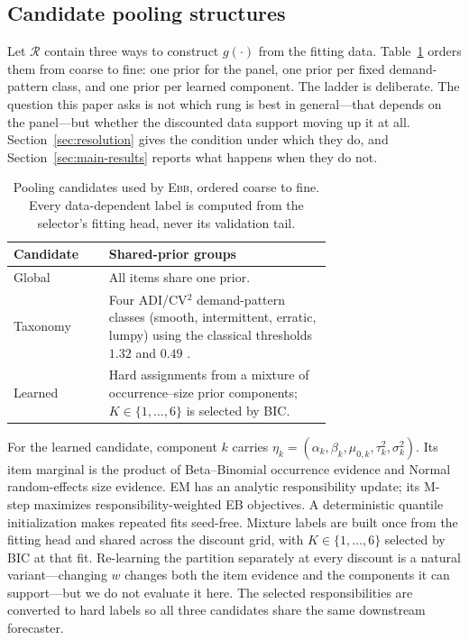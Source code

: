 \documentclass[twocolumn,10pt]{article}
\theoremstyle{definition}
\newcommand{\EBB}{\textsc{Ebb}}
\begin{document}
\subsection{Candidate pooling structures}\label{sec:mixture}

Let $\mathcal R$ contain three ways to construct $g(\cdot)$ from the
fitting data. Table~\ref{tab:pool-candidates} orders them from coarse to
fine: one prior for the panel, one prior per fixed demand-pattern class,
and one prior per learned component. The ladder is deliberate. The
question this paper asks is not which rung is best in general---that
depends on the panel---but whether the discounted data support moving up
it at all. Section~\ref{sec:resolution} gives the condition under which
they do, and Section~\ref{sec:main-results} reports what happens when they
do not.

\begin{table}[t]
\centering
\caption{Pooling candidates used by \EBB{}, ordered coarse to fine.
Every data-dependent label is computed from the selector's fitting head,
never its validation tail.}
\label{tab:pool-candidates}
\small
\setlength{\tabcolsep}{3.5pt}
\begin{tabular}{lp{0.70\linewidth}}
\toprule
Candidate & Shared-prior groups\\
\midrule
Global & All items share one prior.\\
Taxonomy & Four ADI/CV$^2$ demand-pattern classes (smooth, intermittent,
erratic, lumpy) using the classical thresholds $1.32$ and $0.49$
\citep{syntetos2005categorization}.\\
Learned & Hard assignments from a mixture of occurrence--size prior
components; $K\in\{1,\ldots,6\}$ is selected by BIC.\\
\bottomrule
\end{tabular}
\end{table}

For the learned candidate, component $k$ carries
$\eta_k=(\alpha_k,\beta_k,\mu_{0,k},\tau_k^2,\sigma_k^2)$. Its item
marginal is the product of Beta--Binomial occurrence evidence and Normal
random-effects size evidence. EM has an analytic responsibility update;
its M-step maximizes responsibility-weighted EB objectives. A
deterministic quantile initialization makes repeated fits seed-free.
Mixture labels are built once from the fitting head and shared across the
discount grid, with $K\in\{1,\dots,6\}$ selected by BIC at that fit.
Re-learning the partition separately at every discount is a natural
variant---changing $w$ changes both the item evidence and the components
it can support---but we do not evaluate it here. The
selected responsibilities are converted to hard labels so all three
candidates share the same downstream forecaster.
\end{document}
